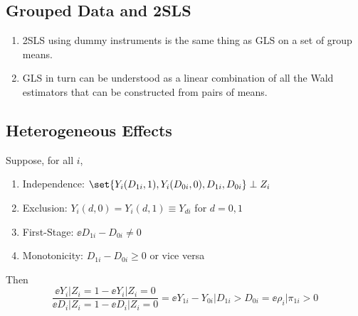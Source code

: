 \documentclass[11pt]{article}
\begin{document}
\subsection{Grouped Data and 2SLS}

\begin{enumerate}
	\item 2SLS using dummy instruments is the same thing as GLS on a set of group means.
	\item GLS in turn can be understood as a linear combination of all the Wald estimators that can be constructed from pairs of means.
\end{enumerate}

\subsection{Heterogeneous Effects}

\begin{theorem}\label{thm:late}
	Suppose, for all $i$, 
	\begin{enumerate}
		\item Independence: $\set{Y_i(D_{1i}, 1), Y_i(D_{0i}, 0), D_{1i}, D_{0i}} \perp Z_i$
		\item Exclusion: $Y_i(d,0) = Y_i(d,1) \equiv Y_{di}$ for $d=0,1$
		\item First-Stage: $\ee{D_{1i} - D_{0i}} \neq 0$
		\item Monotonicity: $D_{1i} - D_{0i} \geq 0$ or vice versa
	\end{enumerate}
	Then
	\begin{equation}
		\frac{\ee{Y_i | Z_i = 1} - \ee{Y_i | Z_i = 0}}{\ee{D_i | Z_i = 1} - \ee{D_i | Z_i = 0}} = \ee{Y_{1i} - Y_{0i} | D_{1i} > D_{0i}} = \ee{\rho_i | \pi_{1i} > 0}
	\end{equation}
\end{theorem}
\end{document}
